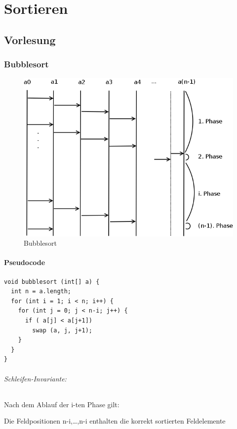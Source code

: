 \part{Sortieren}
\chapter{Vorlesung}
\section{Bubblesort}


\begin{figure}[H]
\begin{center}
\includegraphics[width=0.8\linewidth]{01/Grafik/Bubblesort.png}
\caption{Bubblesort}
\end{center}
\end{figure}


\subsection{Pseudocode}
\begin{lstlisting}[style = pseudo]
void bubblesort (int[] a) {
  int n = a.length;
  for (int i = 1; i < n; i++) {
    for (int j = 0; j < n-i; j++) {
      if ( a[j] < a[j+1])
        swap (a, j, j+1);
    }
  }
}
\end{lstlisting}
\paragraph{Schleifen-Invariante:} Nach dem Ablauf der i-ten Phase gilt:
\begin{center}
	Die Feldpositionen n-i,\ldots,n-i enthalten die korrekt sortierten Feldelemente
\end{center}
